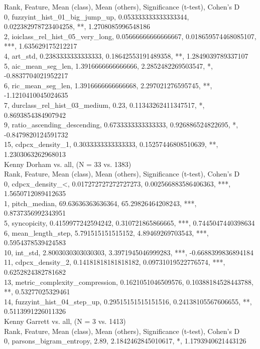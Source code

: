 Rank, Feature, Mean (class), Mean (others), Significance (t-test), Cohen's D\\
0, fuzzyint_hist_01_big_jump_up, 0.053333333333333344, 0.022382978723404258, **, 1.2708085996548186\\
2, ioiclass_rel_hist_05_very_long, 0.05666666666666667, 0.018659574468085107, ***, 1.635629175212217\\
4, art_std, 0.2383333333333333, 0.18642553191489358, **, 1.2849039789337107\\
5, aic_mean_seg_len, 1.3916666666666666, 2.2852482269503547, *, -0.8837704021952217\\
6, ric_mean_seg_len, 1.3916666666666668, 2.297021276595745, **, -1.1210410045024635\\
7, durclass_rel_hist_03_medium, 0.23, 0.11343262411347517, *, 0.8693854384907942\\
9, ratio_ascending_descending, 0.6733333333333333, 0.926886524822695, *, -0.8479820124591732\\
15, cdpcx_density_1, 0.3033333333333333, 0.15257446808510639, **, 1.2303063262968013\\
Kenny Dorham vs. all, (N = 33 vs. 1383)\\
Rank, Feature, Mean (class), Mean (others), Significance (t-test), Cohen's D\\
0, cdpcx_density_<, 0.017272727272727273, 0.002566883586406363, ***, 1.5650712089412635\\
1, pitch_median, 69.63636363636364, 65.29826464208243, ***, 0.8737356992343951\\
5, syncopicity, 0.4159977242594242, 0.310721865866665, ***, 0.7445047440398634\\
6, mean_length_step, 5.791515151515152, 4.89469269703543, ***, 0.5954378539424583\\
10, int_std, 2.8003030303030303, 3.3971945046999283, ***, -0.6688399836894184\\
11, cdpcx_density_2, 0.14181818181818182, 0.09731019522776574, ***, 0.6252824382781682\\
13, metric_complexity_compression, 0.1621051046509576, 0.10388184528443788, **, 0.53277025329461\\
14, fuzzyint_hist_04_step_up, 0.29515151515151516, 0.24138105567606655, **, 0.5113991226011326\\
Kenny Garrett vs. all, (N = 3 vs. 1413)\\
Rank, Feature, Mean (class), Mean (others), Significance (t-test), Cohen's D\\
0, parsons_bigram_entropy, 2.89, 2.1842462845010617, *, 1.1793940621443126\\

